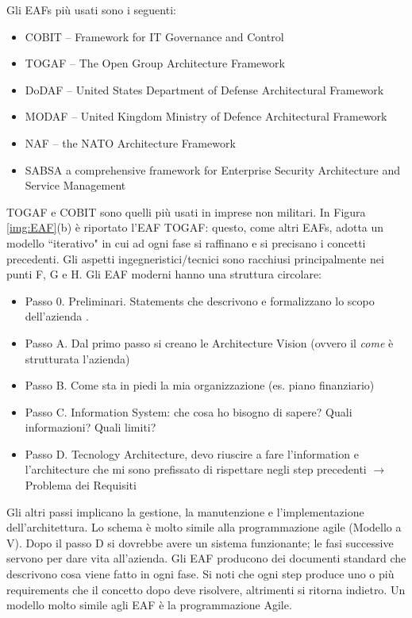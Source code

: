 Gli EAFs più usati sono i seguenti:
\begin{itemize}
	\item COBIT -- Framework for IT Governance and Control
	\item TOGAF -- The Open Group Architecture Framework
	\item DoDAF -- United States Department of Defense Architectural Framework
	\item MODAF -- United Kingdom Ministry of Defence Architectural Framework
	\item NAF -- the NATO Architecture Framework
	\item SABSA a comprehensive framework for Enterprise Security Architecture and Service Management
\end{itemize}
TOGAF e COBIT sono quelli più usati in imprese non militari. In Figura \ref{img:EAF}(b) è riportato l'EAF TOGAF: questo, come altri EAFs, adotta un modello \textquotedblleft iterativo" in cui ad ogni fase si raffinano e si precisano i concetti precedenti. Gli aspetti ingegneristici/tecnici sono racchiusi principalmente nei punti F, G e H. Gli EAF moderni hanno una struttura circolare:
\begin{itemize}
	\item Passo 0. Preliminari. Statements che descrivono e formalizzano lo scopo dell'azienda .
	\item Passo A. Dal primo passo si creano le Architecture Vision (ovvero il \textit{come} è strutturata l'azienda)
	\item Passo B. Come sta in piedi la mia organizzazione (es. piano finanziario)
	\item Passo C. Information System: che cosa ho bisogno di sapere? Quali informazioni? Quali limiti?
	\item Passo D. Tecnology Architecture, devo riuscire a fare l'information e l'architecture che mi sono prefissato di rispettare negli step precedenti $\rightarrow$ Problema dei Requisiti
\end{itemize}
Gli altri passi implicano la gestione, la manutenzione e l'implementazione dell'architettura. Lo schema è molto simile alla programmazione agile (Modello a V). Dopo il passo D si dovrebbe avere un sistema funzionante; le fasi successive servono per dare vita all'azienda. Gli EAF producono dei documenti standard che descrivono cosa viene fatto in ogni fase. Si noti che ogni step produce uno o più requirements che il concetto dopo deve risolvere, altrimenti si ritorna indietro. Un modello molto simile agli EAF è la programmazione Agile.\\

